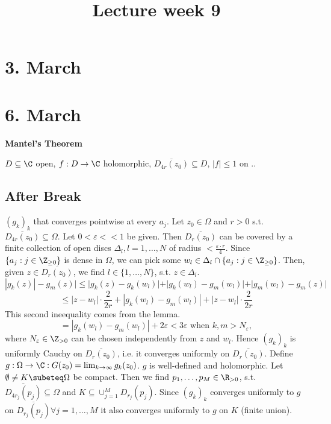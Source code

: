 \title{Lecture week 9}
\section{3. March}



\section{6. March}
\begin{theorem}
  \textbf{Mantel's Theorem}
  \newline
\end{theorem}
\begin{lemma}
  $D \subseteq \C$ open, $f: D\to \C$ holomorphic, $\overline{D_{4r}(z_0)}\subseteq D$, $|f| \leq 1$ on $.$.
\end{lemma}
\subsection{After Break}
$(g_k)_k$ that converges pointwise at every $a_j$. Let $z_0 \in \Omega$ and $r>0$ s.t. $\overline{D_{4r}(z_0)}\subseteq \Omega$. Let $0 < \varepsilon << 1$ be given. Then $\overline{D_{r}(z_0)}$ can be covered by a finite collection of open discs $\Delta_l, l=1,\dots, N$ of radius $< \frac{\varepsilon \cdot r}{4}$. Since $\{a_j : j\in \Z_{\geq 0}\}$
is dense in $\Omega$, we can pick some $w_l \in \Delta_l \cap \{a_j : j\in \Z_{\geq 0}\}$. Then, given $z \in \overline{D_r(z_0)}$, we find $l\in \{1, \dots, N\}$, s.t. $z\in \Delta_l$.
$$|g_k(z)|-g_m(z)|\leq |g_k(z)-g_k(w_l)|+|g_k(w_l)-g_m(w_l)|+|g_m(w_l)-g_m(z)|$$
$$\leq |z-w_l| \cdot \frac{2}{2r} + |g_k(w_l)-g_m(w_l)|+|z-w_l| \cdot \frac{2}{2r}$$
This second ineequality comes from the lemma.
$$=|g_k(w_l)-g_m(w_l)|+2\varepsilon < 3 \varepsilon \text{ when }k,m >N_{\varepsilon},$$
where $N_{\varepsilon}\in \Z_{>0}$ can be chosen independently from $z$ and $w_l$.
Hence $(g_k)_k$ is uniformly Cauchy on $\overline{D_r(z_0)}$, i.e. it converges uniformly on $\overline{D_r(z_0)}$. Define $g: \Omega \to \C: G(z_0) = \lim_{k\to \infty}g_k(z_0)$. $g$ is well-defined and holomorphic. Let $\emptyset\neq K \subeteq \Omega$ be compact. Then we find $p_1, \dots, p_M \in \R_{>0}$, s.t. $\overline{D_{4r_j}(p_j)} \subseteq \Omega$
and $K \subseteq \cup_{j=1}^M D_{r_j}(p_j)$. Since $(g_k)_k$ converges uniformly to $g$ on $\overline{D_{r_j}(p_j)} \forall j =1, \dots, M$ it also converges uniformly to $g$ on $K$ (finite union).

